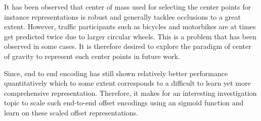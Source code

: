 It has been observed that center of mass used for selecting the center points for instance representations is robust and generally tackles occlusions to a great extent. However, traffic participants such as bicycles and motorbikes are at times get predicted twice due to larger circular wheels. This is a problem that has been observed in some cases. It is therefore desired to explore the paradigm of center of gravity to represent such center points in future work. 

Since, end to end encoding has still shown relatively better performance quantitatively which to some extent corresponds to a difficult to learn yet more comprehensive representation. Therefore, it makes for an interesting investigation topic to scale such end-to-end offset encodings using an sigmoid function and learn on these scaled offset representations.
